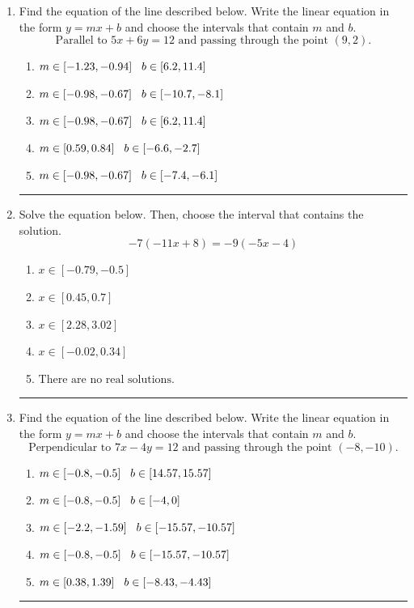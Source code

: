 \documentclass[14pt]{extbook}
\newcommand{\litem}[1]{\item#1\hspace*{-1cm}\rule{\textwidth}{0.4pt}}
\begin{document}
\begin{enumerate}
{\begin{enumerate}[label=\Alph*.]
\end{enumerate} }
\litem{
Find the equation of the line described below. Write the linear equation in the form $ y=mx+b $ and choose the intervals that contain $m$ and $b$.\[ \text{Parallel to } 5 x + 6 y = 12 \text{ and passing through the point } (9, 2). \]\begin{enumerate}[label=\Alph*.]
\item \( m \in [-1.23, -0.94] \hspace*{3mm} b \in [6.2, 11.4] \)
\item \( m \in [-0.98, -0.67] \hspace*{3mm} b \in [-10.7, -8.1] \)
\item \( m \in [-0.98, -0.67] \hspace*{3mm} b \in [6.2, 11.4] \)
\item \( m \in [0.59, 0.84] \hspace*{3mm} b \in [-6.6, -2.7] \)
\item \( m \in [-0.98, -0.67] \hspace*{3mm} b \in [-7.4, -6.1] \)

\end{enumerate} }
\litem{
Solve the equation below. Then, choose the interval that contains the solution.\[ -7(-11x + 8) = -9(-5x -4) \]\begin{enumerate}[label=\Alph*.]
\item \( x \in [-0.79, -0.5] \)
\item \( x \in [0.45, 0.7] \)
\item \( x \in [2.28, 3.02] \)
\item \( x \in [-0.02, 0.34] \)
\item \( \text{There are no real solutions.} \)

\end{enumerate} }
\litem{
Find the equation of the line described below. Write the linear equation in the form $ y=mx+b $ and choose the intervals that contain $m$ and $b$.\[ \text{Perpendicular to } 7 x - 4 y = 12 \text{ and passing through the point } (-8, -10). \]\begin{enumerate}[label=\Alph*.]
\item \( m \in [-0.8, -0.5] \hspace*{3mm} b \in [14.57, 15.57] \)
\item \( m \in [-0.8, -0.5] \hspace*{3mm} b \in [-4, 0] \)
\item \( m \in [-2.2, -1.59] \hspace*{3mm} b \in [-15.57, -10.57] \)
\item \( m \in [-0.8, -0.5] \hspace*{3mm} b \in [-15.57, -10.57] \)
\item \( m \in [0.38, 1.39] \hspace*{3mm} b \in [-8.43, -4.43] \)


\end{enumerate}}
\end{enumerate}
\end{document}

